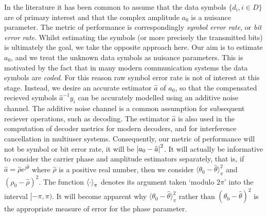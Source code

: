\documentclass[journal]{IEEEtran}
\begin{document}
In the literature it has been common to assume that the data symbols $\{d_i, i \in D\}$ are of primary interest and that the complex amplitude $a_0$ is a nuisance parameter.  The metric of performance is correspondingly \emph{symbol error rate}, or \emph{bit error rate}.  Whilst estimating the symbols (or more precisely the transmitted bits) is ultimately the goal, we take the opposite approach here.  Our aim is to estimate $a_0$, and we treat the unknown data symbols as nuisance parameters.  This is motivated by the fact that in many modern communication systems the data symbols are \emph{coded}.  For this reason raw symbol error rate is not of interest at this stage.  Instead, we desire an accurate estimator $\hat{a}$ of $a_0$, so that the compensated recieved symbols $\hat{a}^{-1}y_i$ can be accurately modelled using an additive noise channel.  The additive noise channel is a common assumption for subsequent reciever operations, such as decoding.  The estimator $\hat{a}$ is also used in the computation of decoder metrics for modern decoders, and for interference cancellation in multiuser systems.  Consequently, our metric of performance will not be symbol or bit error rate, it will be ${\left\vert a_0 - \hat{a} \right\vert}^2$. It will actually be informative to consider the carrier phase and amplitude estimators separately, that is, if $\hat{a} = \hat{\rho}e^{j\hat{\theta}}$ where $\hat{\rho}$ is a positive real number, then we consider $\langle\theta_0 - \hat{\theta}\rangle_\pi^2$ and $(\rho_0 - \hat{\rho})^2$.  The function $\left\langle \cdot \right\rangle_\pi$ denotes its argument taken `modulo $2\pi$' into the interval $[-\pi, \pi)$.  It will become apparent why $\langle\theta_0 - \hat{\theta}\rangle_\pi^2$ rather than $(\theta_0 - \hat{\theta})^2$ is the appropriate measure of error for the phase parameter.
\end{document}
